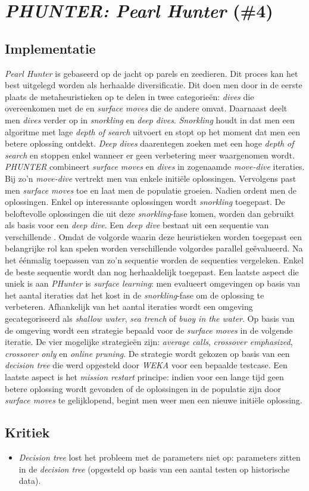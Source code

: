 \section{\emph{PHUNTER: Pearl Hunter} (\#4)}
\label{sss:phunter}
\subsection{Implementatie}
\emph{Pearl Hunter}\cite{chesc-phunter} is gebaseerd op de jacht op parels en zeedieren. Dit proces kan het best uitgelegd worden als herhaalde diversificatie. Dit doen men door in de eerste plaats de metaheuristieken op te delen in twee categorie\"en: \emph{dives} die overeenkomen met de \abls{} \abllhn{} en \emph{surface moves} die de andere \abhn{} omvat. Daarnaast deelt men \emph{dives} verder op in \emph{snorkling} en \emph{deep dives}. \emph{Snorkling} houdt in dat men een \abls{} algoritme met lage \emph{depth of search} uitvoert en stopt op het moment dat men een betere oplossing ontdekt. \emph{Deep dives} daarentegen zoeken met een hoge \emph{depth of search} en stoppen enkel wanneer er geen verbetering meer waargenomen wordt. \emph{PHUNTER} combineert \emph{surface moves} en \emph{dives} in zogenaamde \emph{move-dive} iteraties. Bij zo'n \emph{move-dive} vertrekt men van enkele initi\"ele oplossingen. Vervolgens past men \emph{surface moves} toe en laat men de populatie groeien. Nadien ordent men de oplossingen. Enkel op interessante oplossingen wordt \emph{snorkling} toegepast. De beloftevolle oplossingen die uit deze \emph{snorkling}-fase komen, worden dan gebruikt als basis voor een \emph{deep dive}. Een \emph{deep dive} bestaat uit een sequentie van verschillende \abls{} \abllhn{}. Omdat de volgorde waarin deze heuristieken worden toegepast een belangrijke rol kan spelen worden verschillende volgordes parallel ge\"evalueerd. Na het \'e\'enmalig toepassen van zo'n sequentie worden de sequenties vergeleken. Enkel de beste sequentie wordt dan nog herhaaldelijk toegepast. Een laatste aspect die uniek is aan \emph{PHunter} is \emph{surface learning}: men evalueert omgevingen op basis van het aantal \abls{} iteraties dat het kost in de \emph{snorkling}-fase om de oplossing te verbeteren. Afhankelijk van het aantal iteraties wordt een omgeving gecategoriseerd als \emph{shallow water}, \emph{sea trench} of \emph{buoy in the water}. Op basis van de omgeving wordt een strategie bepaald voor de \emph{surface moves} in de volgende iteratie. De vier mogelijke strategie\"en zijn: \emph{average calls}, \emph{crossover emphasized}, \emph{crossover only} en \emph{online pruning}. De strategie wordt gekozen op basis van een \emph{decision tree} die werd opgesteld door \emph{WEKA} voor een bepaalde testcase. Een laatste aspect is het \emph{mission restart} principe: indien voor een lange tijd geen betere oplossing wordt gevonden of de oplossingen in de populatie zijn door \emph{surface moves} te gelijklopend, begint men weer men een nieuwe initi\"ele oplossing.
\subsection{Kritiek}
\begin{itemize}
 \item \emph{Decision tree} lost het probleem met de parameters niet op: parameters zitten in de \emph{decision tree} (opgesteld op basis van een aantal testen op historische data).
\end{itemize}